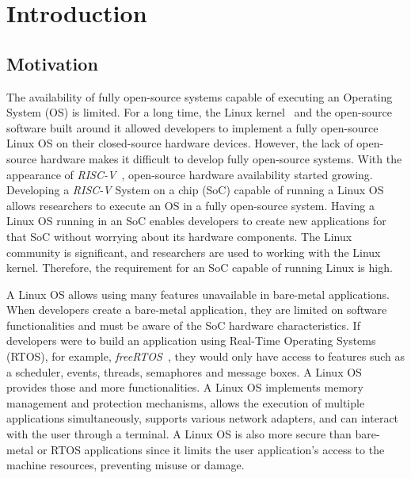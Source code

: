 
\section{Introduction}
\label{sec:intro}

\subsection{Motivation}
The availability of fully open-source systems capable of executing an Operating System (OS) is limited. For a long time, the Linux kernel~\cite{torvalds1997linux} and the open-source software built around it allowed developers to implement a fully open-source Linux OS on their closed-source hardware devices. However, the lack of open-source hardware makes it difficult to develop fully open-source systems. With the appearance of \textit{RISC-V}~\cite{asanovic2014instruction}, open-source hardware availability started growing. Developing a \textit{RISC-V} System on a chip (SoC) capable of running a Linux OS allows researchers to execute an OS in a fully open-source system. Having a Linux OS running in an SoC enables developers to create new applications for that SoC without worrying about its hardware components. The Linux community is significant, and researchers are used to working with the Linux kernel. Therefore, the requirement for an SoC capable of running Linux is high. 

A Linux OS allows using many features unavailable in bare-metal applications. When developers create a bare-metal application, they are limited on software functionalities and must be aware of the SoC hardware characteristics. If developers were to build an application using Real-Time Operating Systems (RTOS), for example, \textit{freeRTOS}~\cite{barry2008freertos}, they would only have access to features such as a scheduler, events, threads, semaphores and message boxes. A Linux OS provides those and more functionalities. A Linux OS implements memory management and protection mechanisms, allows the execution of multiple applications simultaneously, supports various network adapters, and can interact with the user through a terminal. A Linux OS is also more secure than bare-metal or RTOS applications since it limits the user application's access to the machine resources, preventing misuse or damage.

